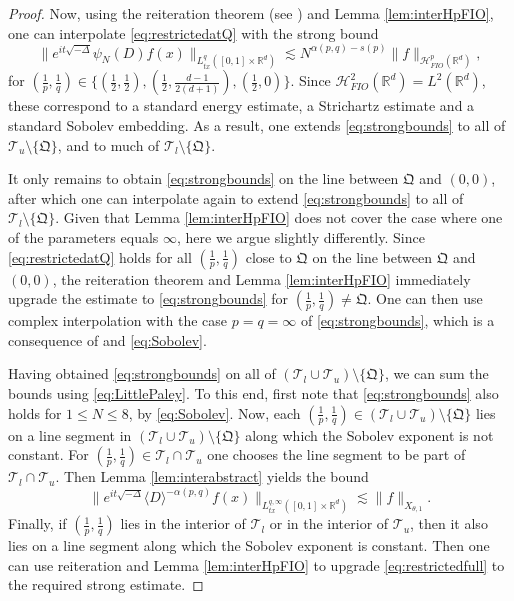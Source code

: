 \documentclass{amsart}
\numberwithin{equation}{section}
\theoremstyle{definition}
\newcommand{\R}{\mathbb{R}}
\newcommand{\Rd}{\mathbb{R}^{d}}
\newcommand {\HT}{\mathcal{H}}
\newcommand {\Hp}{\mathcal{H}^{p}_{FIO}(\R^d)}
\newcommand {\rb}{\rangle}
\newcommand {\lb}{\langle}
\begin{document}
\begin{proof}
Now, using the reiteration theorem (see \cite[Theorem 3.5.3]{Bergh-Lofstrom76}) and Lemma \ref{lem:interHpFIO}, one can interpolate \eqref{eq:restrictedatQ} with the strong bound
\begin{equation}\label{eq:strongbounds}
\|e^{it\sqrt{-\Delta}}\psi_{N}(D)f(x)\|_{L^{q}_{tx}([0,1]\times\Rd)}\lesssim N^{\alpha(p,q)-s(p)}\|f\|_{\Hp},
\end{equation}
for $(\frac{1}{p},\frac{1}{q})\in\{(\frac{1}{2},\frac{1}{2}),(\frac{1}{2},\frac{d-1}{2(d+1)}),(\frac{1}{2},0)\}$. Since $\HT^{2}_{FIO}(\Rd)=L^{2}(\Rd)$, these correspond to a standard energy estimate, a Strichartz estimate and a standard Sobolev embedding. As a result, one extends \eqref{eq:strongbounds} to all of $\mathcal{T}_{u}\setminus \{\mathfrak{Q}\}$, and to much of $\mathcal{T}_{l}\setminus \{\mathfrak{Q}\}$.

It only remains to obtain \eqref{eq:strongbounds} on the line between $\mathfrak{Q}$ and $(0,0)$, after which one can interpolate again to extend \eqref{eq:strongbounds} to all of $\mathcal{T}_{l}\setminus\{\mathfrak{Q}\}$. Given that Lemma \ref{lem:interHpFIO} does not cover the case where one of the parameters equals $\infty$, here we argue slightly differently. Since \eqref{eq:restrictedatQ} holds for all $(\frac{1}{p},\frac{1}{q})$ close to $\mathfrak{Q}$ on the line between $\mathfrak{Q}$ and $(0,0)$, the reiteration theorem and Lemma \ref{lem:interHpFIO} immediately upgrade the estimate to \eqref{eq:strongbounds} for $(\frac{1}{p},\frac{1}{q})\neq \mathfrak{Q}$. One can then use complex interpolation with the case $p=q=\infty$ of \eqref{eq:strongbounds}, which is a consequence of \cite[Corollary 6.11]{HassellPortalRozendaal2020} and \eqref{eq:Sobolev}.

Having obtained \eqref{eq:strongbounds} on all of $(\mathcal{T}_{l}\cup\mathcal{T}_{u})\setminus\{\mathfrak{Q}\}$, we can sum the bounds using \eqref{eq:LittlePaley}. To this end, first note that \eqref{eq:strongbounds} also holds for $1\leq N\leq 8$, by \eqref{eq:Sobolev}. Now, each $(\frac{1}{p},\frac{1}{q})\in (\mathcal{T}_{l}\cup\mathcal{T}_{u})\setminus\{\mathfrak{Q}\}$ lies on a line segment in $(\mathcal{T}_{l}\cup\mathcal{T}_{u})\setminus \{\mathfrak{Q}\}$ along which the Sobolev exponent is not constant. For $(\frac{1}{p},\frac{1}{q})\in \mathcal{T}_{l}\cap \mathcal{T}_{u}$ one chooses the line segment to be part of $\mathcal{T}_{l}\cap \mathcal{T}_{u}$. Then Lemma \ref{lem:interabstract} yields the bound
\begin{equation}\label{eq:restrictedfull}
\|e^{it\sqrt{-\Delta}}\lb D\rb^{-\alpha(p,q)}f(x)\|_{L^{q,\infty}_{tx}([0,1]\times\Rd)}\lesssim \|f\|_{X_{\theta,1}}.
\end{equation}
Finally, if $(\frac{1}{p},\frac{1}{q})$ lies in the interior of $\mathcal{T}_{l}$ or in the interior of $\mathcal{T}_{u}$, then it also lies on a line segment along which the Sobolev exponent is constant. Then one can use reiteration and Lemma \ref{lem:interHpFIO} to upgrade \eqref{eq:restrictedfull} to the required strong estimate. 
\end{proof}
\end{document}
